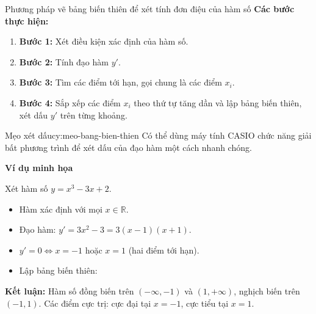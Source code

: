 


\begin{lythuyetbox}{Phương pháp vẽ bảng biến thiên để xét tính đơn điệu của hàm số}
\textbf{Các bước thực hiện:}

\begin{enumerate}
    \item \textbf{Bước 1:} Xét điều kiện xác định của hàm số.
    \item \textbf{Bước 2:} Tính đạo hàm $y'$.
    \item \textbf{Bước 3:} Tìm các điểm tới hạn, gọi chung là các điểm $x_i$.
    \item \textbf{Bước 4:} Sắp xếp các điểm $x_i$ theo thứ tự tăng dần và lập bảng biến thiên, xét dấu $y'$ trên từng khoảng.
\end{enumerate}

\begin{chuy}{Mẹo xét dấu}{cy:meo-bang-bien-thien}
    Có thể dùng máy tính CASIO chức năng giải bất phương trình để xét dấu của đạo hàm một cách nhanh chóng.
\end{chuy}

\textbf{Ví dụ minh họa}

Xét hàm số $y = x^3 - 3x + 2$.

\begin{itemize}
    \item Hàm xác định với mọi $x \in \mathbb{R}$.
    \item Đạo hàm: $y' = 3x^2 - 3 = 3(x-1)(x+1)$.
    \item $y' = 0 \Leftrightarrow x = -1$ hoặc $x = 1$ (hai điểm tới hạn).
    \item Lập bảng biến thiên:
\end{itemize}

\begin{center}
\end{center}

\textbf{Kết luận:} Hàm số đồng biến trên $(-\infty, -1)$ và $(1, +\infty)$, nghịch biến trên $(-1, 1)$. Các điểm cực trị: cực đại tại $x = -1$, cực tiểu tại $x = 1$.

\end{lythuyetbox}

